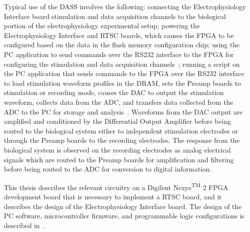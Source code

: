 Typical use of the DASS involves the following: connecting the Electrophysiology Interface board stimulation and data acquisition channels to the biological portion of the electrophysiology experimental setup; powering the Electrophysiology Interface and RTSC boards, which causes the FPGA to be configured based on the data in the flash memory configuration chip; using the PC application to send commands over the RS232 interface to the FPGA for configuring the stimulation and data acquisition channels~\cite{BatzerMSEE}; running a script on the PC application that sends commands to the FPGA over the RS232 interface to load stimulation waveform profiles in the DRAM, sets the Preamp boards to stimulation or recording mode, causes the DAC to output the stimulation waveform, collects data from the ADC, and transfers data collected from the ADC to the PC for storage and analysis~\cite{BatzerMSEE}.  Waveforms from the DAC output are amplified and conditioned by the Differential Output Amplifier before being routed to the biological system either to independent stimulation electrodes or through the Preamp boards to the recording electrodes.  The response from the biological system is observed on the recording electrodes as analog electrical signals which are routed to the Preamp boards for amplification and filtering before being routed to the ADC for conversion to digital information.

This thesis describes the relevant circuitry on a Digilent\textsuperscript{\textregistered} Nexys\textsuperscript{TM} 2 FPGA development board that is necessary to implement a RTSC board, and it describes the design of the Electrophysiology Interface board.  The design of the PC software, microcontroller firmware, and programmable logic configurations is described in~\cite{BatzerMSEE}.

